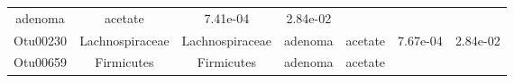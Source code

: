 \documentclass[11pt,]{article}
\begin{document}
\begin{longtable}[]{@{}ccccccc@{}}
\begin{minipage}[t]{0.09\columnwidth}
adenoma\strut
\end{minipage} & \begin{minipage}[t]{0.11\columnwidth}\centering\strut
acetate\strut
\end{minipage} & \begin{minipage}[t]{0.09\columnwidth}\centering\strut
7.41e-04\strut
\end{minipage} & \begin{minipage}[t]{0.09\columnwidth}\centering\strut
2.84e-02\strut
\end{minipage}\tabularnewline
\begin{minipage}[t]{0.09\columnwidth}\centering\strut
Otu00230\strut
\end{minipage} & \begin{minipage}[t]{0.17\columnwidth}\centering\strut
Lachnospiraceae\strut
\end{minipage} & \begin{minipage}[t]{0.17\columnwidth}\centering\strut
Lachnospiraceae\strut
\end{minipage} & \begin{minipage}[t]{0.09\columnwidth}\centering\strut
adenoma\strut
\end{minipage} & \begin{minipage}[t]{0.11\columnwidth}\centering\strut
acetate\strut
\end{minipage} & \begin{minipage}[t]{0.09\columnwidth}\centering\strut
7.67e-04\strut
\end{minipage} & \begin{minipage}[t]{0.09\columnwidth}\centering\strut
2.84e-02\strut
\end{minipage}\tabularnewline
\begin{minipage}[t]{0.09\columnwidth}\centering\strut
Otu00659\strut
\end{minipage} & \begin{minipage}[t]{0.17\columnwidth}\centering\strut
Firmicutes\strut
\end{minipage} & \begin{minipage}[t]{0.17\columnwidth}\centering\strut
Firmicutes\strut
\end{minipage} & \begin{minipage}[t]{0.09\columnwidth}\centering\strut
adenoma\strut
\end{minipage} & \begin{minipage}[t]{0.11\columnwidth}\centering\strut
acetate\strut
\end{minipage} & \begin{minipage}[t]{0.09\columnwidth}\centering\strut

\end{minipage}
\end{longtable}
\end{document}
